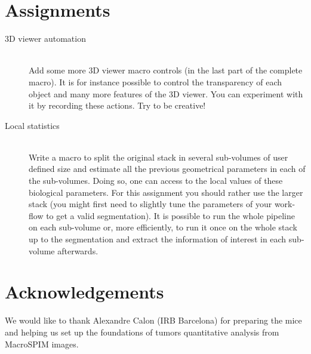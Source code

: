 \section{Assignments}
%
\begin{description}
%
\item[3D viewer automation] \hfill \\
Add some more 3D viewer macro controls (in the last part of the complete macro). It is for instance possible to control the transparency of each object and many more features of the 3D viewer. You can experiment with it by recording these actions. Try to be creative!
%
\item[Local statistics] \hfill \\
Write a macro to split the original stack in several sub-volumes of user defined size and estimate all the previous geometrical parameters in each of the sub-volumes. Doing so, one can access to the local values of these biological parameters. For this assignment you should rather use the larger stack (you might first need to slightly tune the parameters of your work-flow to get a valid segmentation). It is possible to run the whole pipeline on each sub-volume or, more efficiently, to run it once on the whole stack up to the segmentation and extract the information of interest in each sub-volume afterwards. 
%
\end{description}

%
%
%
\section{Acknowledgements}
We would like to thank Alexandre Calon (IRB Barcelona) for preparing the mice and helping us set up the foundations of tumors quantitative analysis from MacroSPIM images.